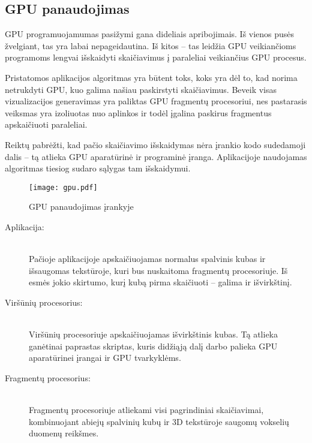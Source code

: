 \subsection{GPU panaudojimas}

GPU programuojamumas pasižymi gana dideliais apribojimais. Iš vienos pusės
žvelgiant, tas yra labai nepageidautina. Iš kitos -- tas leidžia GPU
veikiančioms programoms lengvai išskaidyti skaičiavimus į paraleliai
veikiančius GPU procesus.

Pristatomos aplikacijos algoritmas yra būtent toks, koks yra dėl to, kad
norima netrukdyti GPU, kuo galima našiau paskirstyti skaičiavimus. Beveik
visas vizualizacijos generavimas yra paliktas GPU fragmentų procesoriui, nes
pastarasis veiksmas yra izoliuotas nuo aplinkos ir todėl įgalina paskirus
fragmentus apskaičiuoti paraleliai.

Reiktų pabrėžti, kad pačio skaičiavimo išskaidymas nėra įrankio kodo
sudedamoji dalis -- tą atlieka GPU aparatūrinė ir programinė įranga.
Aplikacijoje naudojamas algoritmas tiesiog sudaro sąlygas tam išskaidymui.

\begin{figure}[!ht]
\centering
\texttt{[image: gpu.pdf]}
\caption{GPU panaudojimas įrankyje}
\label{fig:gpu}
\end{figure}

\begin{description}

\item[Aplikacija:] \hfill \\
  Pačioje aplikacijoje apskaičiuojamas normalus spalvinis kubas ir išsaugomas
  tekstūroje, kuri bus nuskaitoma fragmentų procesoriuje. Iš esmės jokio
  skirtumo, kurį kubą pirma skaičiuoti -- galima ir išvirkštinį.

\item[Viršūnių procesorius:] \hfill \\
  Viršūnių procesoriuje apskaičiuojamas išvirkštinis kubas. Tą atlieka
  ganėtinai paprastas skriptas, kuris didžiąją dalį darbo palieka GPU
  aparatūrinei įrangai ir GPU tvarkyklėms.

\item[Fragmentų procesorius:] \hfill \\
  Fragmentų procesoriuje atliekami visi pagrindiniai skaičiavimai, kombinuojant
  abiejų spalvinių kubų ir 3D tekstūroje saugomų vokselių duomenų reikšmes.

\end{description}


